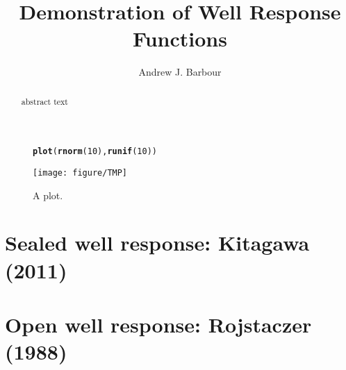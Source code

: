 \documentclass[10pt]{article}\usepackage{graphicx, color}
\author{Andrew J. Barbour}
\title{Demonstration of Well Response Functions}
\makeatletter
\def\maxwidth{ %
  \ifdim\Gin@nat@width>\linewidth
    \linewidth
  \else
    \Gin@nat@width
  \fi
}
\newcommand{\hlfunctioncall}[1]{\textcolor[rgb]{0.501960784313725,0,0.329411764705882}{\textbf{#1}}}%
\newenvironment{kframe}{%
 \def\at@end@of@kframe{}%
 \ifinner\ifhmode%
  \def\at@end@of@kframe{\end{minipage}}%
  \begin{minipage}{\columnwidth}%
 \fi\fi%
 \def\FrameCommand##1{\hskip\@totalleftmargin \hskip-\fboxsep
 \colorbox{shadecolor}{##1}\hskip-\fboxsep
     \hskip-\linewidth \hskip-\@totalleftmargin \hskip\columnwidth}%
 \MakeFramed {\advance\hsize-\width
   \@totalleftmargin\z@ \linewidth\hsize
   \@setminipage}}%
 {\par\unskip\endMakeFramed%
 \at@end@of@kframe}
\newenvironment{knitrout}{}{} %
\makeatother
\begin{document}
\maketitle
%
\newcommand{\SC}[1]{\textsc{#1}}
\newcommand{\Rcmd}[1]{\texttt{#1}}
\newcommand{\bidxa}[1]{\index{#1}{\textbf{#1}}} 
\newcommand{\bidxb}[2]{\index{#2}{\textbf{#1}}} 
\newcommand{\idxa}[1]{\index{#1}{#1}} 
\newcommand{\idxb}[2]{\index{#2}{#1}} 
%
\begin{abstract}
abstract text
\end{abstract}
%
%
\begin{figure}[htb!]
\begin{center}
\begin{knitrout}
\color{fgcolor}\begin{kframe}
\begin{alltt}
\hlfunctioncall{plot}(\hlfunctioncall{rnorm}(10), \hlfunctioncall{runif}(10))
\end{alltt}
\end{kframe}
\texttt{[image: figure/TMP]} 

\end{knitrout}

\caption{A plot.}
\label{fig:tmp}
\end{center}
\end{figure}
%
%
%
%
\section{Sealed well response: Kitagawa (2011)}

\citet{kitagawa2011}

\section{Open well response: Rojstaczer (1988)}

\citet{rojstaczer1988, rojstaczer1988b}




\printindex
\end{document}

